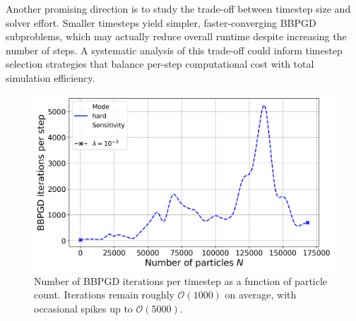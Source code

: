 \documentclass[conference]{IEEEtran}
\begin{document}
Another promising direction is to study the trade-off between timestep size and solver effort. Smaller timesteps yield simpler, faster-converging BBPGD subproblems, which may actually reduce overall runtime despite increasing the number of steps. A systematic analysis of this trade-off could inform timestep selection strategies that balance per-step computational cost with total simulation efficiency.

\newpage

\begin{figure}[h]
    \centering
    \includegraphics[width=\linewidth]{figures/comparison_plots/bbpgd_num_particles_vs_bbpgd_steps.png}
    \caption{Number of BBPGD iterations per timestep as a function of particle count. Iterations remain roughly $\mathcal{O}(1000)$ on average, with occasional spikes up to $\mathcal{O}(5000)$.}
    \label{fig:bbpgd_iterations_per_step_vs_num_particles}
\end{figure}
\end{document}
